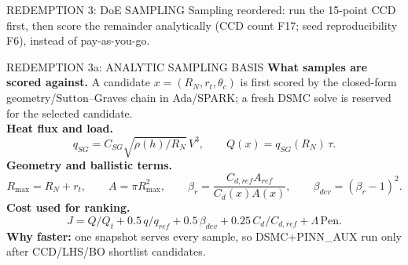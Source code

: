 \documentclass[aspectratio=169,11pt]{beamer}
\begin{document}
\begin{frame}{REDEMPTION 3: DoE SAMPLING}
  Sampling reordered: run the 15-point CCD first, then score the remainder analytically
  (CCD count F17; seed reproducibility F6), instead of pay-as-you-go.
\end{frame}

\begin{frame}{REDEMPTION 3a: ANALYTIC SAMPLING BASIS}
  \small
  \textbf{What samples are scored against.} A candidate
  $x=(R_N,r_t,\theta_c)$ is first scored by the closed-form geometry/Sutton--Graves
  chain in Ada/SPARK; a fresh DSMC solve is reserved for the selected candidate.\\
  \textbf{Heat flux and load.}
  \[
    q_{SG}=C_{SG}\sqrt{\rho(h)/R_N}\,V^3,
    \qquad
    Q(x)=q_{SG}(R_N)\,\tau .
  \]
  \textbf{Geometry and ballistic terms.}
  \[
    R_{\max}=R_N+r_t,\qquad
    A=\pi R_{\max}^2,\qquad
    \beta_r=\frac{C_{d,ref}A_{ref}}{C_d(x)A(x)},\qquad
    \beta_{dev}=(\beta_r-1)^2 .
  \]
  \textbf{Cost used for ranking.}
  \[
    J=Q/Q_t+0.5\,q/q_{ref}+0.5\,\beta_{dev}
      +0.25\,C_d/C_{d,ref}+\Lambda\,\mathrm{Pen}.
  \]
  \textbf{Why faster:} one snapshot serves every sample, so DSMC+PINN\_AUX run only
  after CCD/LHS/BO shortlist candidates.
\end{frame}
\end{document}
